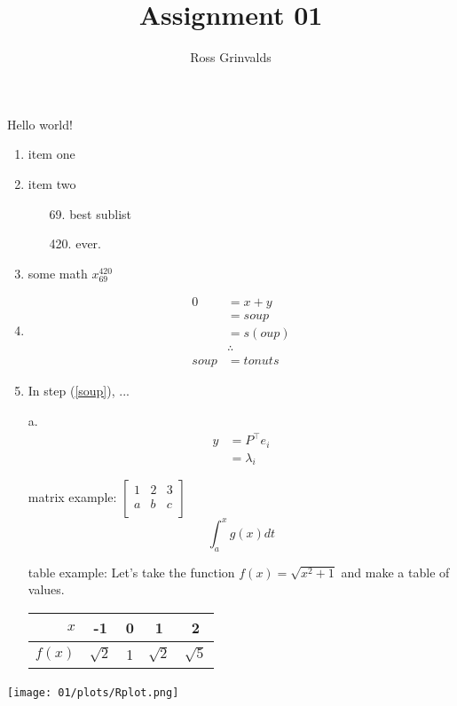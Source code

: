 \documentclass{article}
\begin{document}
\title{Assignment 01}
\author{Ross Grinvalds}
\maketitle

Hello world!

\begin{enumerate}
	\item item one

	\item item two

	\begin{enumerate}
		\item[69.] best sublist
		
		\item[420.] ever.
	
	\end{enumerate}

	\item some math $x^{420}_{69}$
	
	\item
		\begin{align}
			0  &= x + y \\
				 &= soup  \label{soup} \\
				 &= s(oup) \label{soup_factor} \\
				 & \therefore \\
			soup	&= tonuts
		\end{align}
	
	\item In step (\ref{soup}), ...

	\item[a.]
		\begin{align*}
			y &= P^\intercal{}e_i \\
			&=\lambda_i
		\end{align*}

	\item[matrix example:]
		$\begin{bmatrix}
			1 & 2 & 3 \\
			a & b & c \\
		\end{bmatrix}$
		$$\int_{a}^{x}g(x)dt$$

	\item[table example:] Let's take the function $f(x) = \sqrt{x^2 + 1}$ and make a table of values.
		\begin{tabular}{r|cccc}
			$x$ & -1 & 0 & 1 & 2 \\
			\hline
			$f(x)$ & $\sqrt{2}$ & 1 & $\sqrt{2}$ & $\sqrt{5}$
		\end{tabular}

\end{enumerate}

\texttt{[image: 01/plots/Rplot.png]}
\
\end{document}
